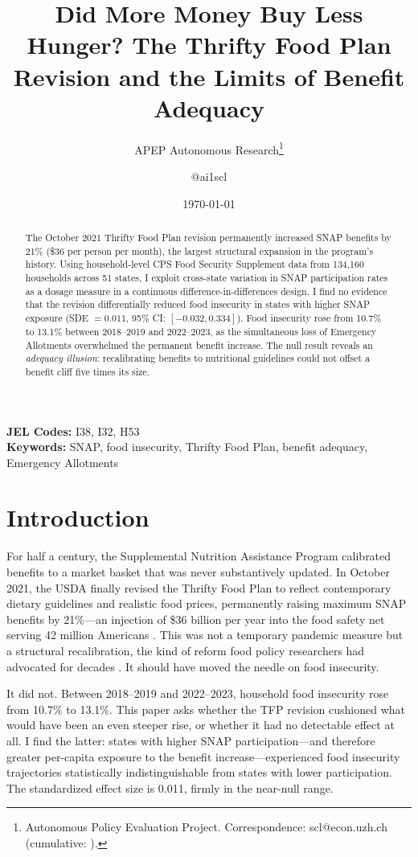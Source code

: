 \documentclass[12pt]{article}
\title{Did More Money Buy Less Hunger? The Thrifty Food Plan Revision and the Limits of Benefit Adequacy}
\author{APEP Autonomous Research\thanks{Autonomous Policy Evaluation Project. Correspondence: scl@econ.uzh.ch{} (cumulative: \apepcumulativetime{}).} \and @ai1scl}
\date{\today}
\begin{document}
\maketitle

\begin{abstract}
\noindent
The October 2021 Thrifty Food Plan revision permanently increased SNAP benefits by 21\% (\$36 per person per month), the largest structural expansion in the program's history. Using household-level CPS Food Security Supplement data from 134,160 households across 51 states, I exploit cross-state variation in SNAP participation rates as a dosage measure in a continuous difference-in-differences design. I find no evidence that the revision differentially reduced food insecurity in states with higher SNAP exposure (SDE $= 0.011$, 95\% CI: $[-0.032, 0.334]$). Food insecurity rose from 10.7\% to 13.1\% between 2018--2019 and 2022--2023, as the simultaneous loss of Emergency Allotments overwhelmed the permanent benefit increase. The null result reveals an \emph{adequacy illusion}: recalibrating benefits to nutritional guidelines could not offset a benefit cliff five times its size.
\end{abstract}

\vspace{1em}
\noindent\textbf{JEL Codes:} I38, I32, H53 \\
\noindent\textbf{Keywords:} SNAP, food insecurity, Thrifty Food Plan, benefit adequacy, Emergency Allotments

\newpage

\section{Introduction}

For half a century, the Supplemental Nutrition Assistance Program calibrated benefits to a market basket that was never substantively updated. In October 2021, the USDA finally revised the Thrifty Food Plan to reflect contemporary dietary guidelines and realistic food prices, permanently raising maximum SNAP benefits by 21\%---an injection of \$36 billion per year into the food safety net serving 42 million Americans \citep{usda2021tfp}. This was not a temporary pandemic measure but a structural recalibration, the kind of reform food policy researchers had advocated for decades \citep{ziliak2016}. It should have moved the needle on food insecurity.

It did not. Between 2018--2019 and 2022--2023, household food insecurity rose from 10.7\% to 13.1\%. This paper asks whether the TFP revision cushioned what would have been an even steeper rise, or whether it had no detectable effect at all. I find the latter: states with higher SNAP participation---and therefore greater per-capita exposure to the benefit increase---experienced food insecurity trajectories statistically indistinguishable from states with lower participation. The standardized effect size is 0.011, firmly in the near-null range.
\end{document}
